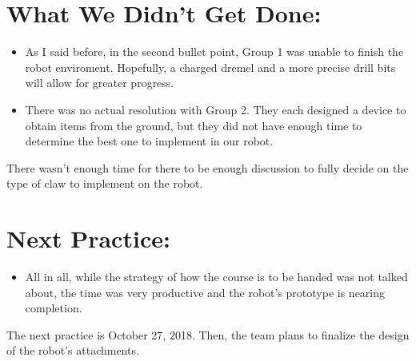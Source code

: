 \documentclass[12pt]{article}
\begin{document}

\section{What We Didn't Get Done:} %
\begin{itemize}
    \item As I said before, in the second bullet point, Group 1 was unable to finish the robot enviroment.  Hopefully, a charged dremel and a more precise drill bits will allow for greater progress. 
    \item There was no actual resolution with Group 2.  They each designed a device to obtain items from the ground, but they did not have enough time to determine the best one to implement in our robot.
\end{itemize}

There wasn't enough time for there to be enough discussion to fully decide on the type of claw to implement on the robot.

\section{Next Practice:}
\begin{itemize}
    \item All in all, while the strategy of how the course is to be handed was not talked about, the time was very productive and the robot's prototype is nearing completion.  
\end{itemize}

The next practice is October 27, 2018.  Then, the team plans to finalize the design of the robot's attachments.
\end{document}

